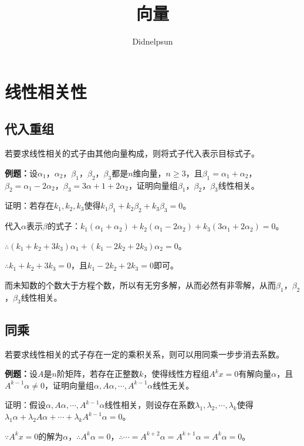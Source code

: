 \documentclass[UTF8, 12pt]{ctexart}
\author{Didnelpsun}
\title{向量}
\date{}
\begin{document}
\maketitle
\pagestyle{empty}
\thispagestyle{empty}
\tableofcontents
\thispagestyle{empty}
\newpage
\pagestyle{plain}
\setcounter{page}{1}

\section{线性相关性}

\subsection{代入重组}

若要求线性相关的式子由其他向量构成，则将式子代入表示目标式子。

\textbf{例题：}设$\alpha_1$，$\alpha_2$，$\beta_1$，$\beta_2$，$\beta_3$都是$n$维向量，$n\geqslant3$，且$\beta_1=\alpha_1+\alpha_2$，$\beta_2=\alpha_1-2\alpha_2$，$\beta_3=3\alpha+1+2\alpha_2$，证明向量组$\beta_1$，$\beta_2$，$\beta_3$线性相关。

证明：若存在$k_1,k_2,k_3$使得$k_1\beta_1+k_2\beta_2+k_3\beta_3=0$。

代入$\alpha$表示$\beta$的式子：$k_1(\alpha_1+\alpha_2)+k_2(\alpha_1-2\alpha_2)+k_3(3\alpha_1+2\alpha_2)=0$。

$\therefore(k_1+k_2+3k_3)\alpha_1+(k_1-2k_2+2k_3)\alpha_2=0$。

$\therefore k_1+k_2+3k_3=0$，且$k_1-2k_2+2k_3=0$即可。

而未知数的个数大于方程个数，所以有无穷多解，从而必然有非零解，从而$\beta_1$，$\beta_2$，$\beta_3$线性相关。

\subsection{同乘}

若要求线性相关的式子存在一定的乘积关系，则可以用同乘一步步消去系数。

\textbf{例题：}设$A$是$n$阶矩阵，若存在正整数$k$，使得线性方程组$A^kx=0$有解向量$\alpha$，且$A^{k-1}\alpha\neq0$，证明向量组$\alpha,A\alpha,\cdots,A^{k-1}\alpha$线性无关。

证明：假设$\alpha,A\alpha,\cdots,A^{k-1}\alpha$线性相关，则设存在系数$\lambda_1,\lambda_2,\cdots,\lambda_k$使得$\lambda_1\alpha+\lambda_2A\alpha+\cdots+\lambda_kA^{k-1}\alpha=0$。

$\because A^kx=0$的解为$\alpha$，$\therefore A^k\alpha=0$，$\therefore\cdots=A^{k+2}\alpha=A^{k+1}\alpha=A^k\alpha=0$。
\end{document}
